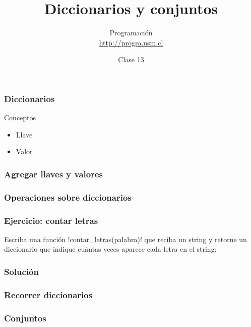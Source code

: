 \documentclass[12pt]{beamer}
\title{Diccionarios y conjuntos}
\author{
  Programación \\ \url{http://progra.usm.cl}
}
\date{Clase 13}
\begin{document}
  \begin{frame}
    \maketitle
  \end{frame}

  \begin{frame}
    \frametitle{Diccionarios}
    \label{dicc-telefonos}
    
    \begin{block}{Conceptos}
      \begin{itemize}
        \item Llave
        \item Valor
      \end{itemize}
    \end{block}
  \end{frame}

  \begin{frame}
    \frametitle{Agregar llaves y valores}
    \label{dicc-agregar}
    
  \end{frame}

  \begin{frame}
    \frametitle{Operaciones sobre diccionarios}
    \label{dicc-operaciones}
    \footnotesize
    
  \end{frame}

  \begin{frame}
    \frametitle{Ejercicio: contar letras}
    \label{ejercicio-contar-letras}
    Escriba una función \li!contar_letras(palabra)!
    que reciba un string y retorne un diccionario
    que indique cuántas veces aparece cada letra en el string:
    
  \end{frame}

  \begin{frame}
    \frametitle{Solución}
    \label{solucion-contar-letras}
    
  \end{frame}

  \begin{frame}
    \frametitle{Recorrer diccionarios}
    \label{recorrer-diccionarios}
    \footnotesize
    
  \end{frame}

  \begin{frame}
    \frametitle{Conjuntos}
    \label{conjuntos-crear}
    
  \end{frame}
\end{document}

